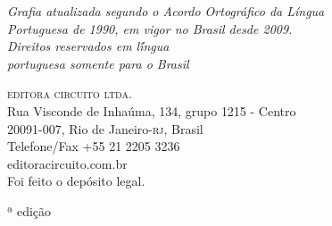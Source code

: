 {\begingroup \tiny

\textit{Grafia atualizada segundo o Acordo Ortográfico da Língua\\
Portuguesa de 1990, em vigor no Brasil desde 2009.}\\


\vfill\textit{Direitos reservados em l\'íngua\\ portuguesa somente para o Brasil}\\\medskip

%
\textsc{editora circuito ltda.}\\ 
Rua Visconde de Inhaúma, 134, grupo 1215 - Centro\\
20091-007, Rio de Janeiro-\textsc{rj}, Brasil\\
Telefone/Fax +55 21 2205 3236\\\smallskip
editoracircuito.com.br\\
\bigskip
Foi feito o depósito legal.\\\endgroup
\pagebreak\raggedleft
\titulagem

{\Large \autor \par\vspace{1.5ex}}
\vspace{1.5cm}

{{\footnotesize{} ª edição} \par}

}
